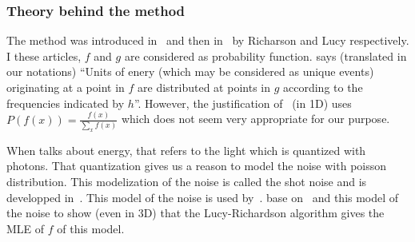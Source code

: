 \subsubsection{Theory behind the method}
The method was introduced in~\cite{richardson1972bayesian} and
then in~\cite{lucy1974iterative} by Richarson and Lucy respectively.
I these articles, $f$ and $g$ are considered as probability function.
\cite{richardson1972bayesian} says (translated in our notations)
``Units of enery (which may be considered as unique events)
originating at a point in $f$ are distributed at points in $g$
according to the frequencies indicated by $h$''.
However, the justification of~\cite{richardson1972bayesian} (in 1D) uses
$P(f(x)) = \frac{f(x)}{\sum_x f(x)}$ which does not seem
very appropriate for our purpose.

When \cite{richardson1972bayesian} talks about energy,
that refers to the light which is quantized with photons.
That quantization gives us a reason to model the noise with
poisson distribution.
This modelization of the noise is called the shot noise and
is developped in~\cite{blanter2000shot}.
This model of the noise is used by~\cite{hebert1989generalized}.
\cite{temerinac2010tile} base on~\cite{hebert1989generalized}
and this model of the noise to show (even in 3D)
that the Lucy-Richardson algorithm gives the MLE of $f$ of this
model.

